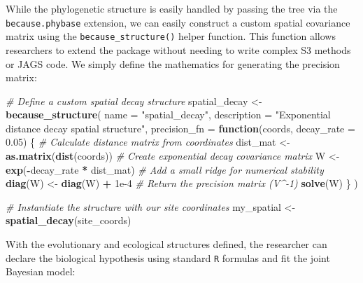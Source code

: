 \documentclass[
]{article}
\newenvironment{Shaded}{\begin{snugshade}}{\end{snugshade}}
\newcommand{\AttributeTok}[1]{\textcolor[rgb]{0.13,0.29,0.53}{#1}}
\newcommand{\CommentTok}[1]{\textcolor[rgb]{0.56,0.35,0.01}{\textit{#1}}}
\newcommand{\ControlFlowTok}[1]{\textcolor[rgb]{0.13,0.29,0.53}{\textbf{#1}}}
\newcommand{\FloatTok}[1]{\textcolor[rgb]{0.00,0.00,0.81}{#1}}
\newcommand{\FunctionTok}[1]{\textcolor[rgb]{0.13,0.29,0.53}{\textbf{#1}}}
\newcommand{\NormalTok}[1]{#1}
\newcommand{\OtherTok}[1]{\textcolor[rgb]{0.56,0.35,0.01}{#1}}
\newcommand{\SpecialCharTok}[1]{\textcolor[rgb]{0.81,0.36,0.00}{\textbf{#1}}}
\newcommand{\StringTok}[1]{\textcolor[rgb]{0.31,0.60,0.02}{#1}}
\begin{document}
While the phylogenetic structure is easily handled by passing the tree via the \texttt{because.phybase} extension, we can easily construct a custom spatial covariance matrix using the \texttt{because\_structure()} helper function. This function allows researchers to extend the package without needing to write complex S3 methods or JAGS code. We simply define the mathematics for generating the precision matrix:

\begin{Shaded}
\begin{Highlighting}[]
\CommentTok{\# Define a custom spatial decay structure}
\NormalTok{spatial\_decay }\OtherTok{\textless{}{-}} \FunctionTok{because\_structure}\NormalTok{(}
    \AttributeTok{name =} \StringTok{"spatial\_decay"}\NormalTok{,}
    \AttributeTok{description =} \StringTok{"Exponential distance decay spatial structure"}\NormalTok{,}
    \AttributeTok{precision\_fn =} \ControlFlowTok{function}\NormalTok{(coords, }\AttributeTok{decay\_rate =} \FloatTok{0.05}\NormalTok{) \{}
        \CommentTok{\# Calculate distance matrix from coordinates}
\NormalTok{        dist\_mat }\OtherTok{\textless{}{-}} \FunctionTok{as.matrix}\NormalTok{(}\FunctionTok{dist}\NormalTok{(coords))}
        \CommentTok{\# Create exponential decay covariance matrix}
\NormalTok{        W }\OtherTok{\textless{}{-}} \FunctionTok{exp}\NormalTok{(}\SpecialCharTok{{-}}\NormalTok{decay\_rate }\SpecialCharTok{*}\NormalTok{ dist\_mat)}
        \CommentTok{\# Add a small ridge for numerical stability}
        \FunctionTok{diag}\NormalTok{(W) }\OtherTok{\textless{}{-}} \FunctionTok{diag}\NormalTok{(W) }\SpecialCharTok{+} \FloatTok{1e{-}4}
        \CommentTok{\# Return the precision matrix (V\^{}{-}1)}
        \FunctionTok{solve}\NormalTok{(W) }
\NormalTok{    \}}
\NormalTok{)}

\CommentTok{\# Instantiate the structure with our site coordinates}
\NormalTok{my\_spatial }\OtherTok{\textless{}{-}} \FunctionTok{spatial\_decay}\NormalTok{(site\_coords)}
\end{Highlighting}
\end{Shaded}

With the evolutionary and ecological structures defined, the researcher can declare the biological hypothesis using standard \texttt{R} formulas and fit the joint Bayesian model:
\end{document}
